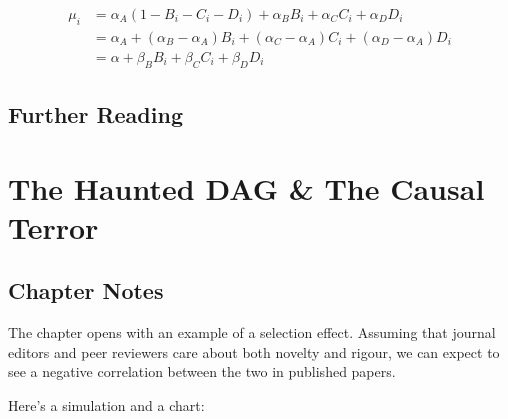 \documentclass[
]{book}
\begin{document}
\[
\begin{aligned}
\mu_i &= \alpha_A(1 − B_i − C_i −D_i) + \alpha_B B_i + \alpha_C C_i + \alpha_D D_i \\
&= \alpha_A + (\alpha_B-\alpha_A)B_i + (\alpha_C -\alpha_A)C_i +(\alpha_D-\alpha_A)D_i  \\
&= \alpha + \beta_B B_i + \beta_C C_i + \beta_D D_i
\end{aligned}          
\]

\hypertarget{further-reading-4}{%
\section*{Further Reading}\label{further-reading-4}}

\hypertarget{haunted_dag}{%
\chapter{The Haunted DAG \& The Causal Terror}\label{haunted_dag}}

\hypertarget{chapter-notes-5}{%
\section{Chapter Notes}\label{chapter-notes-5}}

The chapter opens with an example of a selection effect. Assuming that journal editors and peer reviewers care about both novelty and rigour, we can expect to see a negative correlation between the two in published papers.

Here's a simulation and a chart:
\end{document}
